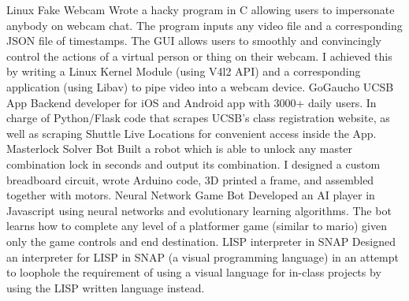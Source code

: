 


\begin{cvskills}

  \vspace{1mm}
  \cvskill 
    {Linux Fake Webcam} %
    {Wrote a hacky program in C allowing users to impersonate anybody on webcam chat. The program inputs any video file and a corresponding JSON file of timestamps. The GUI allows users to smoothly and convincingly control the actions of a virtual person or thing on their webcam. I achieved this by writing a Linux Kernel Module (using V4l2 API) and a corresponding application (using Libav) to pipe video into a webcam device.} %
  \vspace{1mm}
  \cvskill
    {GoGaucho UCSB App} %
    {Backend developer for iOS and Android app with 3000+ daily users. In charge of Python/Flask code that scrapes UCSB's class registration website, as well as scraping Shuttle Live Locations for convenient access inside the App.} %
\cvskill
    {Masterlock Solver Bot} %
    {Built a robot which is able to unlock any master combination lock in seconds and output its combination. I designed a custom breadboard circuit, wrote Arduino code, 3D printed a frame, and assembled together with motors.} %
  \vspace{1mm}
\cvskill
  {Neural Network Game Bot}
  {Developed an AI player in Javascript using neural networks and evolutionary learning algorithms. The bot learns how to complete any level of a platformer game (similar to mario) given only the game controls and end destination.}
  \vspace{1mm}
  \cvskill
    {LISP interpreter in SNAP} %
    {Designed an interpreter for LISP in SNAP (a visual programming language) in an attempt to loophole the requirement of using a visual language for in-class projects by using the LISP written language instead.} %
  \vspace{1mm}

\end{cvskills}
